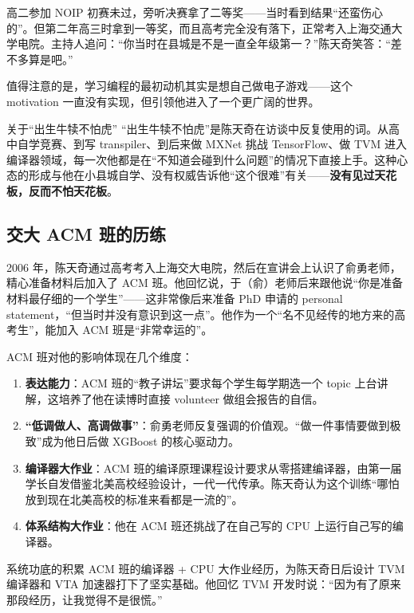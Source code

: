 \documentclass[a4paper]{article}
\begin{document}
高二参加 NOIP 初赛未过，旁听决赛拿了二等奖------当时看到结果``还蛮伤心的''。但第二年高三时拿到一等奖，而且高考完全没有落下，正常考入上海交通大学电院。主持人追问：``你当时在县城是不是一直全年级第一？''陈天奇笑答：``差不多算是吧。''

值得注意的是，学习编程的最初动机其实是想自己做电子游戏------这个 motivation 一直没有实现，但引领他进入了一个更广阔的世界。

\begin{warningbox}{关于``出生牛犊不怕虎''}
``出生牛犊不怕虎''是陈天奇在访谈中反复使用的词。从高中自学竞赛、到写 transpiler、到后来做 MXNet 挑战 TensorFlow、做 TVM 进入编译器领域，每一次他都是在``不知道会碰到什么问题''的情况下直接上手。这种心态的形成与他在小县城自学、没有权威告诉他``这个很难''有关------\textbf{没有见过天花板，反而不怕天花板}。
\end{warningbox}

\subsection{交大 ACM 班的历练}

2006 年，陈天奇通过高考考入上海交大电院，然后在宣讲会上认识了俞勇老师，精心准备材料后加入了 ACM 班。他回忆说，于（俞）老师后来跟他说``你是准备材料最仔细的一个学生''------这非常像后来准备 PhD 申请的 personal statement，``但当时并没有意识到这一点''。他作为一个``名不见经传的地方来的高考生''，能加入 ACM 班是``非常幸运的''。

ACM 班对他的影响体现在几个维度：

\begin{enumerate}
    \item \textbf{表达能力}：ACM 班的``教子讲坛''要求每个学生每学期选一个 topic 上台讲解，这培养了他在读博时直接 volunteer 做组会报告的自信。
    \item \textbf{``低调做人、高调做事''}：俞勇老师反复强调的价值观。``做一件事情要做到极致''成为他日后做 XGBoost 的核心驱动力。
    \item \textbf{编译器大作业}：ACM 班的编译原理课程设计要求从零搭建编译器，由第一届学长自发借鉴北美高校经验设计，一代一代传承。陈天奇认为这个训练``哪怕放到现在北美高校的标准来看都是一流的''。
    \item \textbf{体系结构大作业}：他在 ACM 班还挑战了在自己写的 CPU 上运行自己写的编译器。
\end{enumerate}

\begin{importantbox}{系统功底的积累}
ACM 班的编译器 + CPU 大作业经历，为陈天奇日后设计 TVM 编译器和 VTA 加速器打下了坚实基础。他回忆 TVM 开发时说：``因为有了原来那段经历，让我觉得不是很慌。''
\end{importantbox}
\end{document}
